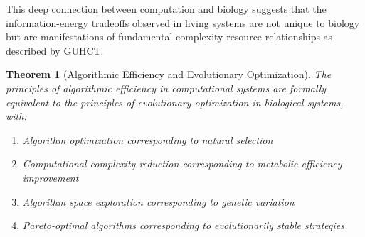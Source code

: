 \documentclass[11pt,a4paper]{article}
\makeatletter
\newtheorem{theorem}{Theorem}[section]
\renewenvironment{proof}[1][\proofname]{\par
  \pushQED{\qed}%
  \normalfont \topsep6\p@\@plus6\p@\relax
  \trivlist
  \item[\hskip\labelsep
        \itshape
    #1\@addpunct{.}]\ignorespaces
}{%
  \popQED\endtrivlist\@endpefalse
}
\makeatother
\begin{document}
\begin{proof}
This deep connection between computation and biology suggests that the information-energy tradeoffs observed in living systems are not unique to biology but are manifestations of fundamental complexity-resource relationships as described by GUHCT.
\end{proof}

\begin{theorem}[Algorithmic Efficiency and Evolutionary Optimization]
\label{thm:algorithmic_evolutionary}
The principles of algorithmic efficiency in computational systems are formally equivalent to the principles of evolutionary optimization in biological systems, with:
\begin{enumerate}
    \item Algorithm optimization corresponding to natural selection
    \item Computational complexity reduction corresponding to metabolic efficiency improvement
    \item Algorithm space exploration corresponding to genetic variation
    \item Pareto-optimal algorithms corresponding to evolutionarily stable strategies
\end{enumerate}
\end{theorem}
\end{document}
